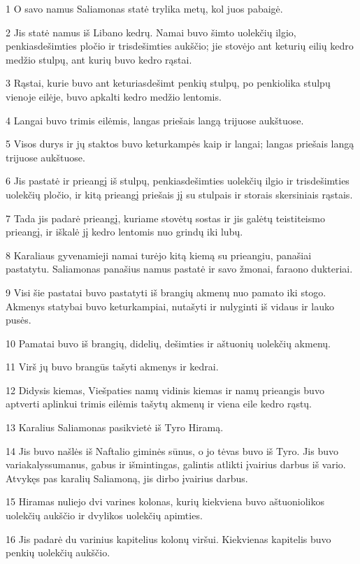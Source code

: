 \par 1 O savo namus Saliamonas statė trylika metų, kol juos pabaigė. 
\par 2 Jis statė namus iš Libano kedrų. Namai buvo šimto uolekčių ilgio, penkiasdešimties pločio ir trisdešimties aukščio; jie stovėjo ant keturių eilių kedro medžio stulpų, ant kurių buvo kedro rąstai. 
\par 3 Rąstai, kurie buvo ant keturiasdešimt penkių stulpų, po penkiolika stulpų vienoje eilėje, buvo apkalti kedro medžio lentomis. 
\par 4 Langai buvo trimis eilėmis, langas priešais langą trijuose aukštuose. 
\par 5 Visos durys ir jų staktos buvo keturkampės kaip ir langai; langas priešais langą trijuose aukštuose. 
\par 6 Jis pastatė ir prieangį iš stulpų, penkiasdešimties uolekčių ilgio ir trisdešimties uolekčių pločio, ir kitą prieangį priešais jį su stulpais ir storais skersiniais rąstais. 
\par 7 Tada jis padarė prieangį, kuriame stovėtų sostas ir jis galėtų teisti­teismo prieangį, ir iškalė jį kedro lentomis nuo grindų iki lubų. 
\par 8 Karaliaus gyvenamieji namai turėjo kitą kiemą su prieangiu, panašiai pastatytu. Saliamonas panašius namus pastatė ir savo žmonai, faraono dukteriai. 
\par 9 Visi šie pastatai buvo pastatyti iš brangių akmenų nuo pamato iki stogo. Akmenys statybai buvo keturkampiai, nutašyti ir nulyginti iš vidaus ir lauko pusės. 
\par 10 Pamatai buvo iš brangių, didelių, dešimties ir aštuonių uolekčių akmenų. 
\par 11 Virš jų buvo brangūs tašyti akmenys ir kedrai. 
\par 12 Didysis kiemas, Viešpaties namų vidinis kiemas ir namų prieangis buvo aptverti aplinkui trimis eilėmis tašytų akmenų ir viena eile kedro rąstų. 
\par 13 Karalius Saliamonas pasikvietė iš Tyro Hiramą. 
\par 14 Jis buvo našlės iš Naftalio giminės sūnus, o jo tėvas buvo iš Tyro. Jis buvo variakalys­sumanus, gabus ir išmintingas, galintis atlikti įvairius darbus iš vario. Atvykęs pas karalių Saliamoną, jis dirbo įvairius darbus. 
\par 15 Hiramas nuliejo dvi varines kolonas, kurių kiekviena buvo aštuoniolikos uolekčių aukščio ir dvylikos uolekčių apimties. 
\par 16 Jis padarė du varinius kapitelius kolonų viršui. Kiekvienas kapitelis buvo penkių uolekčių aukščio. 
